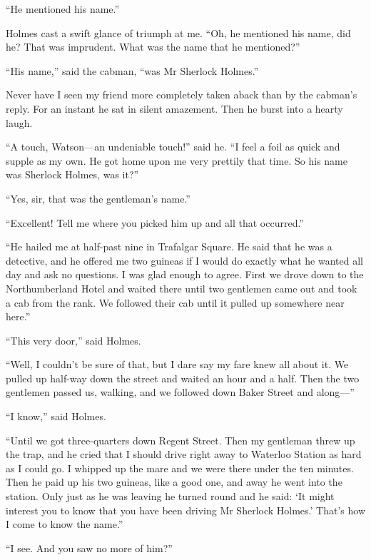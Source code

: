 \documentclass[paper=5.5in:8.5in,BCOR=7mm,twoside,DIV=calc,12pt,usegeometry,openany,chapterprefix,endperiod]{scrbook} %
\begin{document}
\enquote{He mentioned his name.}


Holmes cast a swift glance of triumph at me. \enquote{Oh, he mentioned his name, did he? That was imprudent. What was the name that he mentioned?}

\enquote{His name,} said the cabman, \enquote{was Mr Sherlock Holmes.}

Never have I seen my friend more completely taken aback than by the cabman's reply. For an instant he sat in silent amazement. Then he burst into a hearty laugh.

\enquote{A touch, Watson\nobreakdash---an undeniable touch!} said he. \enquote{I feel a foil as quick and supple as my own. He got home upon me very prettily that time. So his name was Sherlock Holmes, was it?}

\enquote{Yes, sir, that was the gentleman's name.}

\enquote{Excellent! Tell me where you picked him up and all that occurred.}

\enquote{He hailed me at half-past nine in Trafalgar Square. He said that he was a detective, and he offered me two guineas if I would do exactly what he wanted all day and ask no questions. I was glad enough to agree. First we drove down to the Northumberland Hotel and waited there until two gentlemen came out and took a cab from the rank. We followed their cab until it pulled up somewhere near here.}

\enquote{This very door,} said Holmes.

\enquote{Well, I couldn't be sure of that, but I dare say my fare knew all about it. We pulled up half-way down the street and waited an hour and a half. Then the two gentlemen passed us, walking, and we followed down Baker Street and along\nobreakdash---}

\enquote{I know,} said Holmes.

\enquote{Until we got three-quarters down Regent Street. Then my gentleman threw up the trap, and he cried that I should drive right away to Waterloo Station as hard as I could go. I whipped up the mare and we were there under the ten minutes. Then he paid up his two guineas, like a good one, and away he went into the station. Only just as he was leaving he turned round and he said: \enquote{It might interest you to know that you have been driving Mr Sherlock Holmes.} That's how I come to know the name.}

\enquote{I see. And you saw no more of him?}
\end{document}
